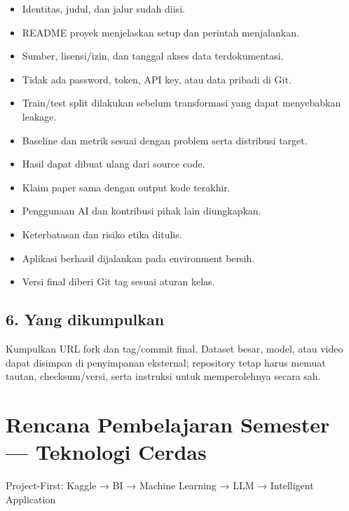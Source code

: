 \documentclass[
  indonesian,
  letterpaper,
  DIV=11,
  numbers=noendperiod]{scrreprt}
\providecommand{\tightlist}{%
  \setlength{\itemsep}{0pt}\setlength{\parskip}{0pt}}
\begin{document}
\begin{itemize}
\tightlist
\item[$\square$]
  Identitas, judul, dan jalur sudah diisi.
\item[$\square$]
  README proyek menjelaskan setup dan perintah menjalankan.
\item[$\square$]
  Sumber, lisensi/izin, dan tanggal akses data terdokumentasi.
\item[$\square$]
  Tidak ada password, token, API key, atau data pribadi di Git.
\item[$\square$]
  Train/test split dilakukan sebelum transformasi yang dapat menyebabkan
  leakage.
\item[$\square$]
  Baseline dan metrik sesuai dengan problem serta distribusi target.
\item[$\square$]
  Hasil dapat dibuat ulang dari source code.
\item[$\square$]
  Klaim paper sama dengan output kode terakhir.
\item[$\square$]
  Penggunaan AI dan kontribusi pihak lain diungkapkan.
\item[$\square$]
  Keterbatasan dan risiko etika ditulis.
\item[$\square$]
  Aplikasi berhasil dijalankan pada environment bersih.
\item[$\square$]
  Versi final diberi Git tag sesuai aturan kelas.
\end{itemize}

\section{6. Yang dikumpulkan}\label{yang-dikumpulkan}

Kumpulkan URL fork dan tag/commit final. Dataset besar, model, atau
video dapat disimpan di penyimpanan eksternal; repository tetap harus
memuat tautan, checksum/versi, serta instruksi untuk memperolehnya
secara sah.


\chapter{Rencana Pembelajaran Semester --- Teknologi
Cerdas}\label{rencana-pembelajaran-semester-teknologi-cerdas}

Project-First: Kaggle → BI → Machine Learning → LLM → Intelligent
Application

\hfill\break

\end{document}
